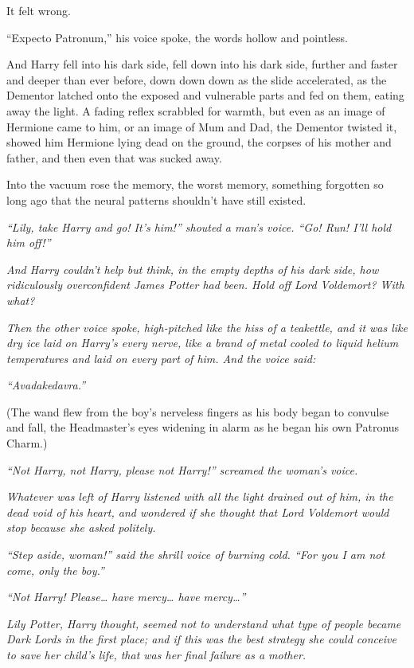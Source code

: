 It felt wrong.

``Expecto Patronum,'' his voice spoke, the words hollow and pointless.

And Harry fell into his dark side, fell down into his dark side, further
and faster and deeper than ever before, down down down as the slide
accelerated, as the Dementor latched onto the exposed and vulnerable
parts and fed on them, eating away the light. A fading reflex scrabbled
for warmth, but even as an image of Hermione came to him, or an image of
Mum and Dad, the Dementor twisted it, showed him Hermione lying dead on
the ground, the corpses of his mother and father, and then even that was
sucked away.

Into the vacuum rose the memory, the worst memory, something forgotten
so long ago that the neural patterns shouldn't have still existed.

\emph{``Lily, take Harry and go! It's him!'' shouted a man's voice.
``Go! Run! I'll hold him off!''}

\emph{And Harry couldn't help but think, in the empty depths of his dark
side, how ridiculously overconfident James Potter had been. Hold off
Lord Voldemort? With what?}

\emph{Then the other voice spoke, high-pitched like the hiss of a
teakettle, and it was like dry ice laid on Harry's every nerve, like a
brand of metal cooled to liquid helium temperatures and laid on every
part of him. And the voice said:}

\emph{``Avadakedavra.''}

(The wand flew from the boy's nerveless fingers as his body began to
convulse and fall, the Headmaster's eyes widening in alarm as he began
his own Patronus Charm.)

\emph{``Not Harry, not Harry, please not Harry!'' screamed the woman's
voice.}

\emph{Whatever was left of Harry listened with all the light drained out
of him, in the dead void of his heart, and wondered if she thought that
Lord Voldemort would stop because she asked politely.}

\emph{``Step aside, woman!'' said the shrill voice of burning cold.
``For you I am not come, only the boy.''}

\emph{``Not Harry! Please\ldots{} have mercy\ldots{} have
mercy\ldots{}''}

\emph{Lily Potter, Harry thought, seemed not to understand what type of
people became Dark Lords in the first place; and if this was the best
strategy she could conceive to save her child's life, that was her final
failure as a mother.}

